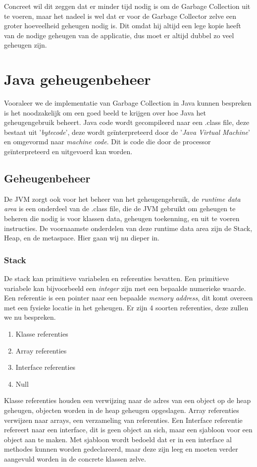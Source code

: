 Concreet wil dit zeggen dat er minder tijd nodig is om de Garbage Collection uit te voeren, maar het nadeel is wel dat er voor de Garbage Collector zelve een groter hoeveelheid geheugen nodig is.
Dit omdat hij altijd een lege kopie heeft van de nodige geheugen van de applicatie, dus moet er altijd dubbel zo veel geheugen zijn. \autocite{Siqiu2019}


\section{Java geheugenbeheer}
\label{sec:java geheugenbeheer}
Vooraleer we de implementatie van Garbage Collection in Java kunnen bespreken is het noodzakelijk om een goed beeld te krijgen over hoe Java het geheugengebruik beheert.
Java code wordt gecompileerd naar een .class file, deze bestaat uit '\textit{bytecode}', deze wordt geïnterpreteerd door de '\textit{Java Virtual Machine}' en omgevormd naar \textit{machine code}.
Dit is code die door de processor geïnterpreteerd en uitgevoerd kan worden.

\subsection{Geheugenbeheer}

De JVM zorgt ook voor het beheer van het geheugengebruik, de \textit{runtime data area} is een onderdeel van de .class file, die de JVM gebruikt om geheugen te beheren die nodig is voor klassen data, geheugen toekenning, en uit te voeren instructies.\autocite{Putten2022}
De voornaamste onderdelen van deze runtime data area zijn de Stack, Heap, en de metaspace.
Hier gaan wij nu dieper in.

\subsubsection{Stack}
\label{sec:Stack}

De stack kan primitieve variabelen en referenties bevatten.
Een primitieve variabele kan bijvoorbeeld een \textit{integer} zijn met een bepaalde numerieke waarde.
Een referentie is een pointer naar een bepaalde \textit{memory address}, dit komt overeen met een fysieke locatie in het geheugen.\autocite{Huck1993}
Er zijn 4 soorten referenties, deze zullen we nu bespreken.
\begin{enumerate}
    \item Klasse referenties
    \item Array referenties
    \item Interface referenties
    \item Null
\end{enumerate}
Klasse referenties houden een verwijzing naar de adres van een object op de heap geheugen, objecten worden in de heap geheugen opgeslagen.
Array referenties verwijzen naar arrays, een verzameling van referenties.
Een Interface referentie refereert naar een interface, dit is geen object an sich, maar een sjabloon voor een object aan te maken.
Met sjabloon wordt bedoeld dat er in een interface al methodes kunnen worden gedeclareerd, maar deze zijn leeg en moeten verder aangevuld worden in de concrete klassen zelve.

